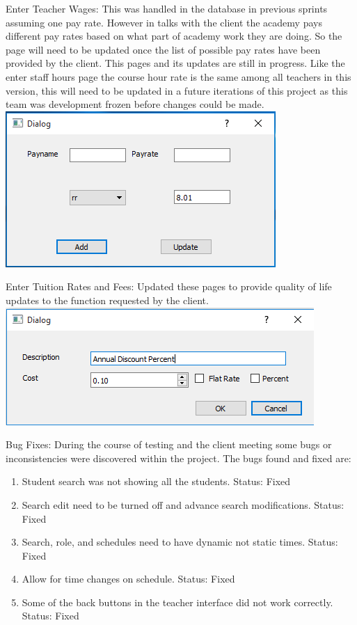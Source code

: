 Enter Teacher Wages:
This was handled in the database in previous sprints assuming one pay rate. However in talks with the client the academy pays different pay rates based on what part of academy work they are doing. So the page will need to be updated once the list of possible pay rates have been provided by the client. This pages and its updates are still in progress. Like the enter staff hours page the course hour rate is the same among all teachers in this version, this will need to be updated in a future iterations of this project as this team was development frozen before changes could be made. \\

\includegraphics[scale=0.5]{payRates.png}

Enter Tuition Rates and Fees:
Updated these pages to provide quality of life updates to the function requested by the client.\\

\includegraphics[scale=0.5]{feeDialog.png}

Bug Fixes:
During the course of testing and the client meeting some bugs or inconsistencies were discovered within the project. The bugs found and fixed are:

\begin{enumerate}
\item Student search was not showing all the students. Status: Fixed
\item Search edit need to be turned off and advance search modifications. Status: Fixed
\item Search, role, and schedules need to have dynamic not static times. Status: Fixed
\item Allow for time changes on schedule. Status: Fixed
\item Some of the back buttons in the teacher interface did not work correctly. Status: Fixed 
\end{enumerate}

